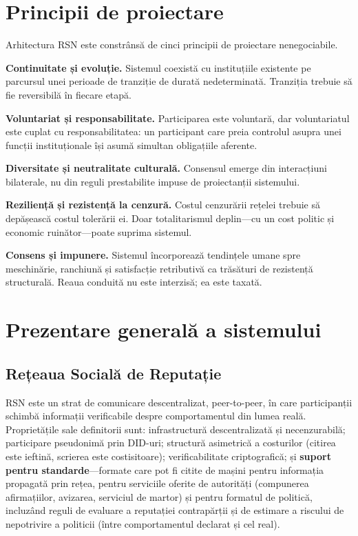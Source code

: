 \documentclass[11pt,a4paper,twocolumn]{article}
\begin{document}
\section{Principii de proiectare}

Arhitectura RSN este constrânsă de cinci principii de proiectare nenegociabile.

\textbf{Continuitate și evoluție.} Sistemul coexistă cu instituțiile existente pe parcursul unei perioade de tranziție de durată nedeterminată. Tranziția trebuie să fie reversibilă în fiecare etapă.

\textbf{Voluntariat și responsabilitate.} Participarea este voluntară, dar voluntariatul este cuplat cu responsabilitatea: un participant care preia controlul asupra unei funcții instituționale își asumă simultan obligațiile aferente.

\textbf{Diversitate și neutralitate culturală.} Consensul emerge din interacțiuni bilaterale, nu din reguli prestabilite impuse de proiectanții sistemului.

\textbf{Reziliență și rezistență la cenzură.} Costul cenzurării rețelei trebuie să depășească costul tolerării ei. Doar totalitarismul deplin---cu un cost politic și economic ruinător---poate suprima sistemul.

\textbf{Consens și impunere.} Sistemul încorporează tendințele umane spre meschinărie, ranchiună și satisfacție retributivă ca trăsături de rezistență structurală. Reaua conduită nu este interzisă; ea este taxată.

\section{Prezentare generală a sistemului}

\subsection{Rețeaua Socială de Reputație}

RSN este un strat de comunicare descentralizat, peer-to-peer, în care participanții schimbă informații verificabile despre comportamentul din lumea reală. Proprietățile sale definitorii sunt: infrastructură descentralizată și necenzurabilă; participare pseudonimă prin DID-uri; structură asimetrică a costurilor (citirea este ieftină, scrierea este costisitoare); verificabilitate criptografică; și \textbf{suport pentru standarde}---formate care pot fi citite de mașini pentru informația propagată prin rețea, pentru serviciile oferite de autorități (compunerea afirmațiilor, avizarea, serviciul de martor) și pentru formatul de politică, incluzând reguli de evaluare a reputației contrapărții și de estimare a riscului de nepotrivire a politicii (între comportamentul declarat și cel real).
\end{document}
